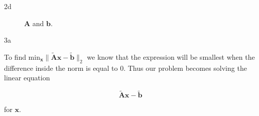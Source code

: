 \documentclass{article}
\begin{document}
\begin{homeworkProblem}
\begin{homeworkSection}{2d}
\begin{centering}
\begin{figure}[!ht]
            \caption{\label{fig:2d} $\bm{A}$ and $\bm{b}$.}

        \end{figure}
        \end{centering}

    \end{homeworkSection}

\end{homeworkProblem}

\begin{homeworkProblem}

    \begin{homeworkSection}{3a}

        To find min$_{\bm{x}} \|\tilde{\bm{A}}\bm{x} - \tilde{\bm{b}}\|_2$ we
        know that the expression will be smallest when the difference inside
        the norm is equal to 0. Thus our problem becomes solving the linear
        equation

        \begin{equation*}
            \tilde{\bm{A}}\bm{x} - \tilde{\bm{b}}
        \end{equation*}

        \noindent for $\bm{x}$. 

    \end{homeworkSection}

\end{homeworkProblem}
\end{document}
